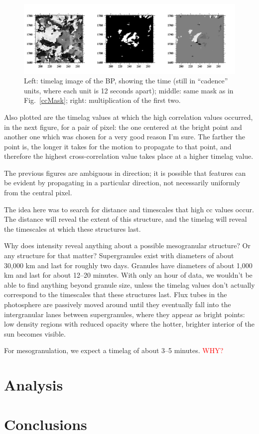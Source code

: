 \documentclass[preprint]{aastex}
\begin{document}
\begin{figure}[h!]
        \includegraphics[width=\textwidth]{../figures/bp1_ttMask.png}
        \caption{Left: timelag image of the BP, showing the time
            (still in ``cadence'' units, where each unit is 12 seconds
            apart);
            middle: same mask as in Fig.~\ref{ccMask};
            right: multiplication of the first two.}
\end{figure}


Also plotted are the timelag values at which the
high correlation values occurred, in the next figure, for a pair
of pixel: the one centered at the bright point and another one which
was chosen for a very good reason I'm sure.
The farther the point is, the longer it takes for the motion to
propagate to that point, and therefore the highest cross-correlation
value takes place at a higher timelag value.

The previous figures are ambiguous in direction; it is possible that
features can be evident by propagating in a particular direction, not
necessarily uniformly from the central pixel.

The idea here was to search for distance and timescales that high
cc values occur. The distance will reveal the extent of this structure,
and the timelag will reveal the timescales at which these structures
last.

Why does intensity reveal anything about a possible mesogranular
structure? Or any structure for that matter?
Supergranules exist with diameters of about 30,000 km and last for
roughly two days. Granules have diameters of about 1,000 km and last
for about 12--20 minutes. With only an hour of data, we wouldn't be able
to find anything beyond granule size, unless the timelag values don't
actually correspond to the timescales that these structures last.
Flux tubes in the photosphere are passively moved around until they
eventually fall into the intergranular lanes between supergranules,
where they appear as bright points: low density regions with reduced
opacity where the hotter, brighter interior of the sun becomes visible.

For mesogranulation, we expect a timelag of about 3--5 minutes.
\textcolor{red}{WHY?}


\section{Analysis}


\section{Conclusions}


\end{document}
